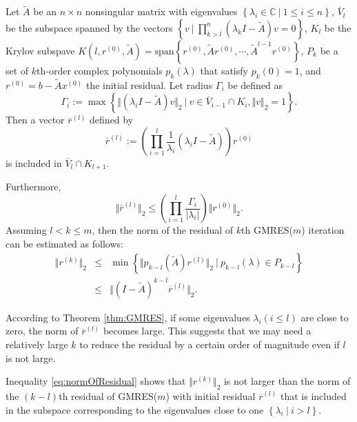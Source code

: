 \begin{thm}
  \label{thm:GMRES}
  Let $\tilde{A}$ be an $n\times n$ nonsingular matrix with
  eigenvalues $\left\{\lambda_i\in\mathbb{C}\ |\  1\leq i \leq n\right\}$,
  $\overline{V}_l$ be the subspace spanned by the vectors
  $\left\{ v\ |\ \prod_{k>l}^n(\lambda_kI-\tilde{A})v=0\right\}$,
  $K_l$ be the Krylov subspave
  $K(l,r^{(0)},\tilde{A})=\mbox{span}\left\{ r^{(0)},
    \tilde{A}r^{(0)},\cdots, \tilde{A}^{l-1}r^{(0)}\right\}$, 
  $P_k$ be a set of $k$th-order complex polynomials $p_k(\lambda)$ that
  satisfy $p_k(0)=1$, and $r^{(0)}=b-\tilde{A}x^{(0)}$ the initial
  residual. Let radius $\Gamma_i$ be defined as
  \begin{equation}
    \label{eq:Radius}
    \Gamma_i := \max\left\{\Vert (\lambda_iI-\tilde{A})v \Vert_2\ |\ 
      v\in\overline{V}_{i-1}\cap K_i, \Vert v \Vert_2=1\right\}.
  \end{equation}
  Then a vector $\overline{r}^{(l)}$ defined by
  \begin{equation}
    \label{eq:rl}
    \overline{r}^{(l)} :=
    \left(\prod\limits_{i=1}^l\frac{1}{\lambda_i}(\lambda_iI-\tilde{A})\right)r^{(0)}
  \end{equation}
  is included in $\overline{V}_l\cap K_{l+1}.$

  Furthermore,
  \begin{equation}
    \label{eq:normOfrRl}
    \Vert \overline{r}^{(l)} \Vert_2 \leq
    \left(\prod\limits_{i=1}^l\frac{\Gamma_i}{|\lambda_i|}\right)
    \Vert r^{(0)}\Vert_2.
  \end{equation}
  Assuming $l<k\leq m$, then the norm of the residual of $k$th
  GMRES($m$) iteration can be estimated as follows:
  \begin{eqnarray}
    \label{eq:normOfResidual}
    \Vert r^{(k)} \Vert_2&\leq& \min\left\{\Vert
    p_{k-l}(\tilde{A})r^{(l)}\Vert_2 \ |\  p_{k-l}(\lambda)\in P_{k-l}\right\}
    \\
    \label{eq:normOfResidual2}
                         &\leq& \Vert (I-\tilde{A})^{k-l}\overline{r}^{(l)} \Vert_2.
  \end{eqnarray}
\end{thm}

According to Theorem \ref{thm:GMRES}, if some eigenvalues
$\lambda_i(i\leq l)$ are close to zero, the norm of
$\overline{r}^{(l)}$ becomes large. This suggests that we may need a
relatively large $k$ to reduce the residual by a certain order of
magnitude even if $l$ is not large.

Inequality \eqref{eq:normOfResidual} shows that $\Vert r^{(k)}
\Vert_2$ is not larger than the norm of the $(k-l)$th residual of
GMRES($m$) with initial residual $\overline{r}^{(l)}$ that is included
in the subspace corresponding to the eigenvalues close to one
$\left\{\lambda_i\ |\ i>l\right\}$.

